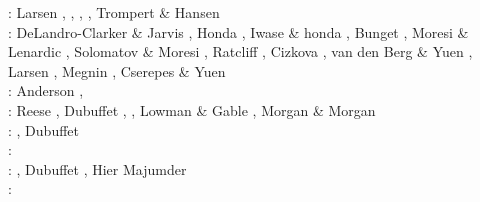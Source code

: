 \begin{scriptsize}
\nineteenninetysix: Larsen \etal \cite{laym96}, \cite{zhyu96},
                    \cite{hond96}\cite{rytr96a}
                    \cite{rytr96b}\cite{tack96}
                    \cite{trbo96}, \cite{birg96}
                    \cite{burb96}\cite{kafo96}
                    \cite{guez96}\cite{vayu96}
                    \cite{rasz96}\cite{rasz96b}
                    \cite{leka96}\cite{iwas96}
                    \cite{buri96}\cite{schh96}, Trompert \& Hansen \cite{trha96}\\
\nineteenninetyseven: DeLandro-Clarker \& Jarvis \cite{deja97}, Honda \cite{hond97}, 
                      Iwase \& honda \cite{iwho97}, Bunget \etal \cite{burb97},
                      Moresi \& Lenardic \cite{mole97}, Solomatov \& Moresi \cite{somo97},
                      Ratcliff \etal \cite{rats97}, Cizkova \etal \cite{cicv97},
                      van den Berg \& Yuen \cite{vayu97}, Larsen \etal \cite{laym97},
                      Megnin \etal \cite{mebr97}, Cserepes \& Yuen \cite{csyu97}\\
\nineteenninetyeight: Anderson \cite{ande98}, \cite{iwho98}\cite{devv98}\cite{tack98}\cite{tack98b}\cite{trha98b}
      \cite{trha98}\cite{burl98}\cite{mokm98}\cite{lena98}\cite{vayu98}\cite{wema98}\\
\nineteenninetynine: Reese \etal \cite{resb99}, Dubuffet \etal \cite{duyr99}, 
                     \cite{vazh99}\cite{dava99}
                     \cite{tabg99}\cite{como99}
                     \cite{cicv99}\cite{trrj99},
                     Lowman \& Gable \cite{loga99}, Morgan \& Morgan \cite{momo99}\\ 
\twothousand: \cite{albe00}\cite{hayu00}
              \cite{devv00b}\cite{tack00}
              \cite{tack00b}\cite{tack00c}
              \cite{tack00d}\cite{zhzm00}
              \cite{legm00}\cite{conr00}
              \cite{somo00},  Dubuffet \etal \cite{duyu00,duyy00}\\
\twothousandone: \cite{vank01}\cite{riyb01}
                 \cite{lemo01}\cite{vays01}
                 \cite{moqu01}\cite{zhon01}
                 \cite{burm01}\cite{dabu01}\\
\twothousandtwo: \cite{tasu02}\cite{modm02}
                 \cite{tack02}\cite{vaya02}
                 \cite{vayu02}\cite{taxi02}
                 \cite{scbh02}\cite{strb02}, 
                 Dubuffet \etal \cite{duyr02}, Hier Majumder \etal{} \cite{hiys02}\\
\twothousandthree: \cite{hapa03}\cite{lemo03}
                   \cite{mumc03}\cite{fasa03}
                   \cite{heta03}\cite{sibu03}

\end{scriptsize}
